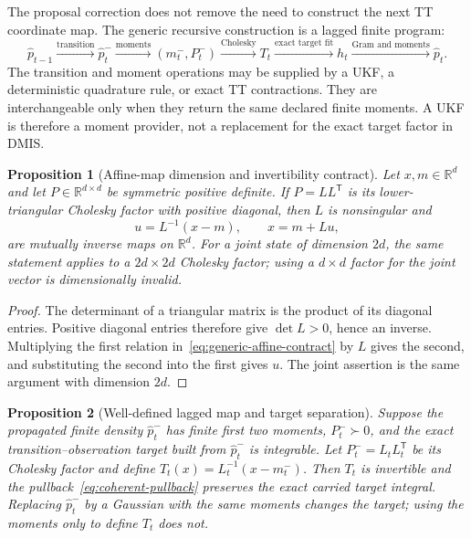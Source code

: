\documentclass[11pt]{article}
\newtheorem{proposition}{Proposition}
\begin{document}
The proposal correction does not remove the need to construct the next TT
coordinate map. The generic recursive construction is a lagged finite program:
\begin{equation}\label{eq:generic-recursive-program}
  \widehat p_{t-1}
  \xrightarrow{\text{transition}}
  \widehat p_t^-
  \xrightarrow{\text{moments}}
  (m_t^-,P_t^-)
  \xrightarrow{\text{Cholesky}}
  T_t
  \xrightarrow{\text{exact target fit}}
  h_t
  \xrightarrow{\text{Gram and moments}}
  \widehat p_t.
\end{equation}
The transition and moment operations may be supplied by a UKF, a deterministic
quadrature rule, or exact TT contractions. They are interchangeable only when
they return the same declared finite moments. A UKF is therefore a moment
provider, not a replacement for the exact target factor in DMIS.

\begin{proposition}[Affine-map dimension and invertibility contract]
\label{prop:generic-affine-contract}
Let $x,m\in\mathbb R^d$ and let $P\in\mathbb R^{d\times d}$ be symmetric
positive definite.  If $P=LL^\mathsf T$ is its lower-triangular Cholesky
factor with positive diagonal, then $L$ is nonsingular and
\begin{equation}\label{eq:generic-affine-contract}
  u=L^{-1}(x-m),\qquad x=m+Lu,
\end{equation}
are mutually inverse maps on $\mathbb R^d$.  For a joint state of dimension
$2d$, the same statement applies to a $2d\times2d$ Cholesky factor; using a
$d\times d$ factor for the joint vector is dimensionally invalid.
\end{proposition}

\begin{proof}
The determinant of a triangular matrix is the product of its diagonal
entries.  Positive diagonal entries therefore give $\det L>0$, hence an
inverse.  Multiplying the first relation in~\eqref{eq:generic-affine-contract}
by $L$ gives the second, and substituting the second into the first gives $u$.
The joint assertion is the same argument with dimension $2d$.
\end{proof}

\begin{proposition}[Well-defined lagged map and target separation]
\label{prop:generic-recursive-map}
Suppose the propagated finite density $\widehat p_t^-$ has finite first two
moments, $P_t^-\succ0$, and the exact transition--observation target built
from $\widehat p_t^-$ is integrable. Let $P_t^-=L_tL_t^\mathsf T$ be its
Cholesky factor and define $T_t(x)=L_t^{-1}(x-m_t^-)$. Then $T_t$ is invertible and
the pullback~\eqref{eq:coherent-pullback} preserves the exact carried target
integral. Replacing $\widehat p_t^-$ by a Gaussian with the same moments
changes the target; using the moments only to define $T_t$ does not.
\end{proposition}
\end{document}
